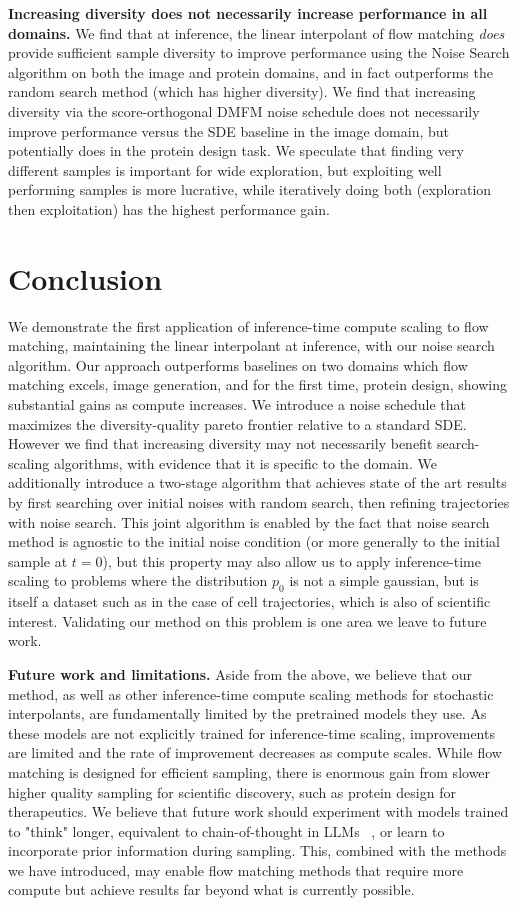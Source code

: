 \documentclass{article} %
\begin{document}
\textbf{Increasing diversity does not necessarily increase performance in all domains.} We find that at inference, the linear interpolant of flow matching \textit{does} provide sufficient sample diversity to improve performance using the Noise Search algorithm on both the image and protein domains, and in fact outperforms the random search method (which has higher diversity). We find that increasing diversity via the score-orthogonal DMFM noise schedule does not necessarily improve performance versus the SDE baseline in the image domain, but potentially does in the protein design task. We speculate that finding very different samples is important for wide exploration, but exploiting well performing samples is more lucrative, while iteratively doing both (exploration then exploitation) has the highest performance gain.

\section{Conclusion}
We demonstrate the first application of inference-time compute scaling to flow matching, maintaining the linear interpolant at inference, with our noise search algorithm. Our approach outperforms baselines on two domains which flow matching excels, image generation, and for the first time, protein design, showing substantial gains as compute increases. We introduce a noise schedule that maximizes the diversity-quality pareto frontier relative to a standard SDE. However we find that increasing diversity may not necessarily benefit search-scaling algorithms, with evidence that it is specific to the domain. We additionally introduce a two-stage algorithm that achieves state of the art results by first searching over initial noises with random search, then refining trajectories with noise search. This joint algorithm is enabled by the fact that noise search method is agnostic to the initial noise condition (or more generally to the initial sample at $t=0$), but this property may also allow us to apply inference-time scaling to problems where the distribution $p_0$ is not a simple gaussian, but is itself a dataset such as in the case of cell trajectories, which is also of scientific interest. Validating our method on this problem is one area we leave to future work.

\textbf{Future work and limitations.} Aside from the above, we believe that our method, as well as other inference-time compute scaling methods for stochastic interpolants, are fundamentally limited by the pretrained models they use. As these models are not explicitly trained for inference-time scaling, improvements are limited and the rate of improvement decreases as compute scales. While flow matching is designed for efficient sampling, there is enormous gain from slower higher quality sampling for scientific discovery, such as protein design for therapeutics. We believe that future work should experiment with models trained to "think" longer, equivalent to chain-of-thought in LLMs ~\cite{openai2024o1}, or learn to incorporate prior information during sampling. This, combined with the methods we have introduced, may enable flow matching methods that require more compute but achieve results far beyond what is currently possible.
\end{document}
